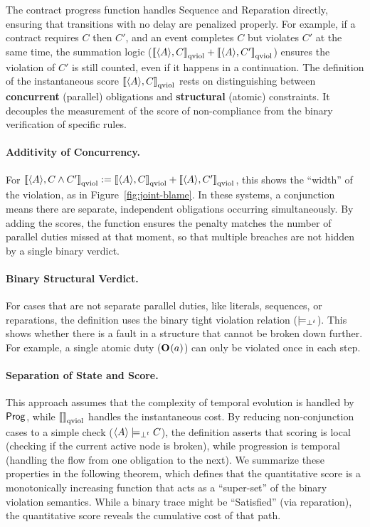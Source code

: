 The contract progress function handles Sequence and Reparation directly, ensuring that transitions with no delay are penalized properly. For example, if a contract requires $C$ then $C'$, and an event completes $C$ but violates $C'$ at the same time, the summation logic ($\left\llbracket \langle A \rangle , C \right\rrbracket_{\text{qviol}} + \left\llbracket \langle A \rangle , C' \right\rrbracket_{\text{qviol}}$) ensures the violation of $C'$ is still counted, even if it happens in a continuation.
The definition of the instantaneous score $\left\llbracket \langle A \rangle , C \right\rrbracket_{\text{qviol}}$ rests on distinguishing between \textbf{concurrent} (parallel) obligations and \textbf{structural} (atomic) constraints. It decouples the measurement of the score  of non-compliance from the binary verification of specific rules.

\paragraph{Additivity of Concurrency.}
For $\left\llbracket \langle A \rangle , C \wedge C' \right\rrbracket_{\text{qviol}} := \left\llbracket \langle A \rangle , C  \right\rrbracket_{\text{qviol}} + \left\llbracket \langle A \rangle , C' \right\rrbracket_{\text{qviol}}$, this shows the ``width'' of the violation, as in Figure~\ref{fig:joint-blame}. In these systems, a conjunction means there are separate, independent obligations occurring simultaneously. By adding the scores, the function ensures the penalty matches the number of parallel duties missed at that moment, so that multiple breaches are not hidden by a single binary verdict.
\paragraph{Binary Structural Verdict.}
For cases that are not separate parallel duties, like literals, sequences, or reparations, the definition uses the binary tight violation relation ($\models_{\bot^t}$). This shows whether there is a fault in a structure that cannot be broken down further. For example, a single atomic duty ($\mathbf{O}_{}(a)$) can only be violated once in each step.

\paragraph{Separation of State and Score.}
This approach assumes that the complexity of temporal evolution is handled by $\mathsf{Prog}$, while $\left\llbracket  \right\rrbracket_{\text{qviol}}$ handles the instantaneous cost. By reducing non-conjunction cases to a simple check ($\langle A \rangle  \models_{\bot^t} C$), the definition asserts that scoring is local (checking if the current active node is broken), while progression is temporal (handling the flow from one obligation to the next).
We summarize these properties in the following theorem, which defines that the quantitative score is a monotonically increasing function that acts as a ``super-set'' of the binary violation semantics. While a binary trace might be ``Satisfied'' (via reparation), the quantitative score reveals the cumulative cost of that path.


